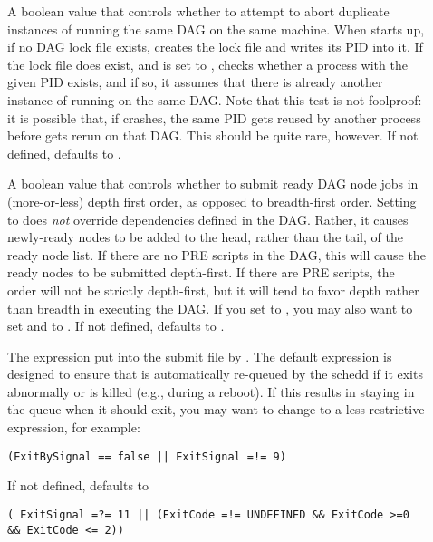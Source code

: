 \begin{description}
\item[]
\label{param:DAGManAbortDuplicates}
A boolean value that controls whether to attempt to abort duplicate
instances of  running the same DAG on the same
machine.  When  starts up, if no DAG lock file exists,
 creates the lock file and writes its PID into it.  If
the lock file does exist, and  is
set to ,  checks whether a process with the
given PID exists, and if so, it assumes that there is already another
instance of  running on the same DAG.  Note that this
test is not foolproof: it is possible that, if  crashes,
the same PID gets reused by another process before 
gets rerun on that DAG.  This should be quite rare, however.
If not defined,  defaults to
.

\item[]
\label{param:DAGManSubmitDepthFirst}
A boolean value that controls whether to submit ready DAG node jobs
in (more-or-less) depth first order, as opposed to breadth-first order.
Setting  to  does
\emph{not} override dependencies defined in the DAG.  Rather, it
causes newly-ready nodes to be added to the head, rather than the tail,
of the ready node list.  If there are no PRE scripts in the DAG, this
will cause the ready nodes to be submitted depth-first.  If there
are PRE scripts, the order will not be strictly depth-first, but it
will tend to favor depth rather than breadth in executing the DAG.
If you set  to ,
you may also want to set  and
 to .
If not defined,  defaults to
.

\item[]
\label{param:DAGManOnExitRemove}
The  expression put into the  submit
file by .
The default expression is designed to ensure that  is
automatically re-queued by the schedd if it exits abnormally or is
killed (e.g., during a reboot).  If this results in 
staying in the queue when it should exit, you may want to change
to a less restrictive expression, for example:
\begin{verbatim}
(ExitBySignal == false || ExitSignal =!= 9)
\end{verbatim}
If not defined,  defaults to
\begin{verbatim}
( ExitSignal =?= 11 || (ExitCode =!= UNDEFINED && ExitCode >=0 && ExitCode <= 2))
\end{verbatim}


\end{description}
